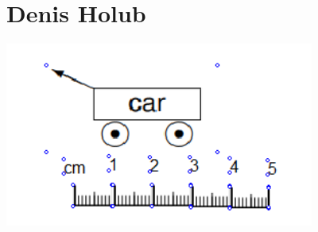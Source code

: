 \documentclass{article}
\begin{document}
\newpage
\section{Denis Holub}

\includegraphics[width=4in]{car.png}
\end{document}

